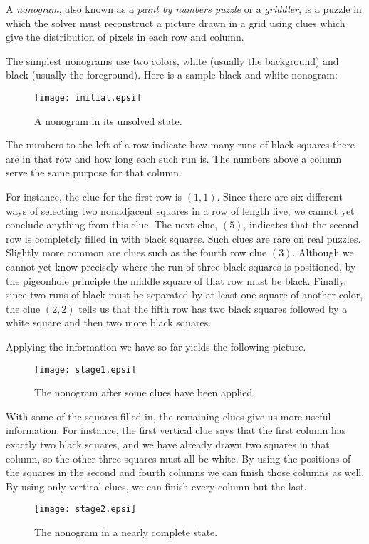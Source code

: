 \documentclass[12pt]{article}
\begin{document}
A \emph{nonogram}, also known as a \emph{paint by numbers puzzle} or a
\emph{griddler}, is a puzzle in which the solver must reconstruct a
picture drawn in a grid using clues which give the distribution of
pixels in each row and column.

The simplest nonograms use two colors, white (usually the background)
and black (usually the foreground).  Here is a sample black and white
nonogram:
\begin{figure}[hh]
\begin{center}
\texttt{[image: initial.epsi]}
\caption{A nonogram in its unsolved state.}
\end{center}
\end{figure}
The numbers to the left of a row indicate how many runs of black
squares there are in that row and how long each such run is.  The
numbers above a column serve the same purpose for that column.

For instance, the clue for the first row is $(1,1)$.  Since there are
six different ways of selecting two nonadjacent squares in a row of
length five, we cannot yet conclude anything from this clue.  The next
clue, $(5)$, indicates that the second row is completely filled in
with black squares.  Such clues are rare on real puzzles.  Slightly
more common are clues such as the fourth row clue $(3)$.  Although we
cannot yet know precisely where the run of three black squares is
positioned, by the pigeonhole principle the middle square of that row
must be black.  Finally, since two runs of black must be separated by
at least one square of another color, the clue $(2,2)$ tells us that
the fifth row has two black squares followed by a white square and
then two more black squares. 

Applying the information we have so far yields the following picture.
\begin{figure}[hh]
\begin{center}
\texttt{[image: stage1.epsi]}
\caption{The nonogram after some clues have been applied.}
\end{center}
\end{figure}
With some of the squares filled in, the remaining clues give us more
useful information.  For instance, the first vertical clue says that
the first column has exactly two black squares, and we have already
drawn two squares in that column, so the other three squares must all
be white.  By using the positions of the squares in the second and
fourth columns we can finish those columns as well.  By using only
vertical clues, we can finish every column but the last.
\begin{figure}[hh]
\begin{center}
\texttt{[image: stage2.epsi]}
\caption{The nonogram in a nearly complete state.}
\end{center}
\end{figure}
\end{document}
